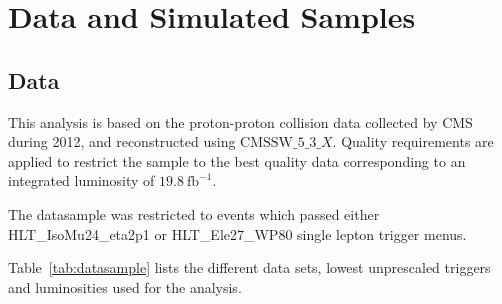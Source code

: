 \section{Data and Simulated Samples}\label{Samples}
\subsection{Data}

This analysis is based on the proton-proton collision data collected
by CMS during 2012, and reconstructed using $\textrm{CMSSW}\_5\_3\_X$. Quality requirements 
are applied to restrict the sample to the best quality data corresponding to an
integrated luminosity of $19.8~\textrm{fb}^{-1}$.


The datasample was restricted to events which passed either 
HLT\_IsoMu24\_eta2p1 or HLT\_Ele27\_WP80 single lepton trigger menus. 


Table~\ref{tab:datasample} lists the different data sets, lowest unprescaled triggers and luminosities used for the analysis.

